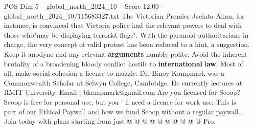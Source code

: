 \begin{textsample}{POS Dim 5 – global\_north\_2024\_10 – Score 12.00 – global\_north\_2024\_10/115683327.txt}
The Victorian Premier Jacinta Allan, for instance, is convinced that Victoria police had the relevant powers to deal with those who"may be displaying terrorist flags".
With the paranoid authoritarians in charge, the very concept of valid protest has been reduced to a hint, a suggestion.
Keep it anodyne and any relevant \textbf{arguments} humbly polite.
Avoid the inherent brutality of a broadening bloody conflict hostile to \textbf{international} \textbf{law}.
Most of all, make social cohesion a license to muzzle.
Dr.
Binoy Kampmark was a Commonwealth Scholar at Selwyn College, Cambridge.
He currently lectures at RMIT University.
Email : bkampmark@gmail.com Are you licensed for Scoop?
Scoop is free for personal use, but you ' ll need a licence for work use.
This is part of our Ethical Paywall and how we fund Scoop without a regular paywall.
Join today with plans starting from just @ @ @ @ @ @ @ @ @ @ Pro.

\end{textsample}
